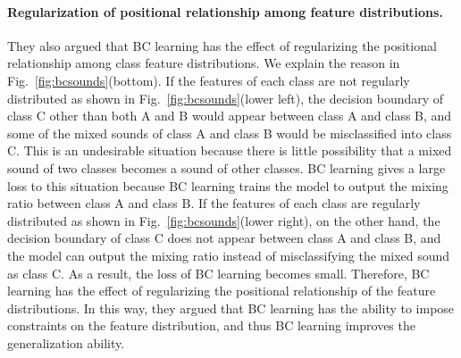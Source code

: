 \documentclass[10pt,twocolumn,letterpaper]{article}
\begin{document}
\paragraph{Regularization of positional relationship among feature distributions.}
They also argued that BC learning has the effect of regularizing the positional relationship among class feature distributions. We explain the reason in Fig.~\ref{fig:bcsounds}(bottom). If the features of each class are not regularly distributed as shown in Fig.~\ref{fig:bcsounds}(lower left), the decision boundary of class C other than both A and B would appear between class A and class B, and some of the mixed sounds of class A and class B would be misclassified into class C. This is an undesirable situation because there is little possibility that a mixed sound of two classes becomes a sound of other classes. BC learning gives a large loss to this situation because BC learning trains the model to output the mixing ratio between class A and class B. If the features of each class are regularly distributed as shown in Fig.~\ref{fig:bcsounds}(lower right), on the other hand, the decision boundary of class C does not appear between class A and class B, and the model can output the mixing ratio instead of misclassifying the mixed sound as class C. As a result, the loss of BC learning becomes small. Therefore, BC learning has the effect of regularizing the positional relationship of the feature distributions. In this way, they argued that BC learning has the ability to impose constraints on the feature distribution, and thus BC learning improves the generalization ability.


\end{document}
